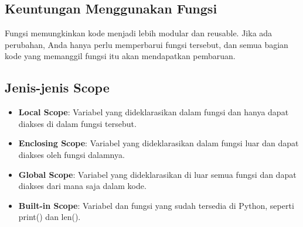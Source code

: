 \documentclass{article}
\begin{document}
\subsection{Keuntungan Menggunakan Fungsi}
Fungsi memungkinkan kode menjadi lebih modular dan reusable. Jika ada perubahan, Anda hanya perlu memperbarui fungsi tersebut, dan semua bagian kode yang memanggil fungsi itu akan mendapatkan pembaruan.

\subsection{Jenis-jenis Scope}
\begin{itemize}
    \item \textbf{Local Scope}: Variabel yang dideklarasikan dalam fungsi dan hanya dapat diakses di dalam fungsi tersebut.
    \item \textbf{Enclosing Scope}: Variabel yang dideklarasikan dalam fungsi luar dan dapat diakses oleh fungsi dalamnya.
    \item \textbf{Global Scope}: Variabel yang dideklarasikan di luar semua fungsi dan dapat diakses dari mana saja dalam kode.
    \item \textbf{Built-in Scope}: Variabel dan fungsi yang sudah tersedia di Python, seperti print() dan len().
\end{itemize}
\end{document}
